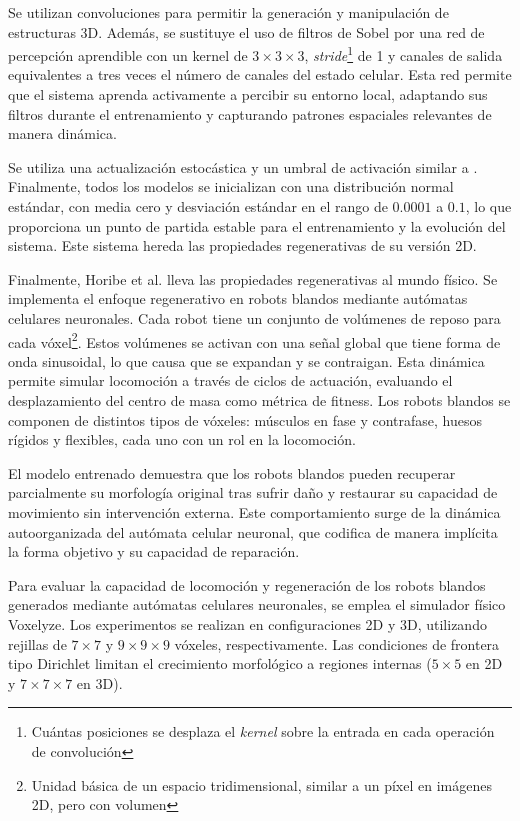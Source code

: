Se utilizan convoluciones para permitir la generación y manipulación de estructuras 3D. Además, se sustituye el uso de filtros de Sobel por una red de percepción aprendible con un kernel de $3 \times 3 \times 3$, \textit{stride}\footnote{Cuántas posiciones se desplaza el \textit{kernel} sobre la entrada en cada operación de convolución} de 1 y canales de salida equivalentes a tres veces el número de canales del estado celular. Esta red permite que el sistema aprenda activamente a percibir su entorno local, adaptando sus filtros durante el entrenamiento y capturando patrones espaciales relevantes de manera dinámica.

Se utiliza una actualización estocástica y un umbral de activación similar a \cite{mordvintsevNCA}. Finalmente, todos los modelos se inicializan con una distribución normal estándar, con media cero y desviación estándar en el rango de $0.0001$ a $0.1$, lo que proporciona un punto de partida estable para el entrenamiento y la evolución del sistema. Este sistema hereda las propiedades regenerativas de su versión 2D.

Finalmente, Horibe et al. \cite{horibe} lleva las propiedades regenerativas al mundo físico. Se implementa el enfoque regenerativo en robots blandos mediante autómatas celulares neuronales. Cada robot tiene un conjunto de volúmenes de reposo para cada vóxel\footnote{Unidad básica de un espacio tridimensional, similar a un píxel en imágenes 2D, pero con volumen}. Estos volúmenes se activan con una señal global que tiene forma de onda sinusoidal, lo que causa que se expandan y se contraigan. Esta dinámica permite simular locomoción a través de ciclos de actuación, evaluando el desplazamiento del centro de masa como métrica de fitness. Los robots blandos se componen de distintos tipos de vóxeles: músculos en fase y contrafase, huesos rígidos y flexibles, cada uno con un rol en la locomoción.

El modelo entrenado demuestra que los robots blandos pueden recuperar parcialmente su morfología original tras sufrir daño y restaurar su capacidad de movimiento sin intervención externa. Este comportamiento surge de la dinámica autoorganizada del autómata celular neuronal, que codifica de manera implícita la forma objetivo y su capacidad de reparación.

Para evaluar la capacidad de locomoción y regeneración de los robots blandos generados mediante autómatas celulares neuronales, se emplea el simulador físico Voxelyze. Los experimentos se realizan en configuraciones 2D y 3D, utilizando rejillas de $7 \times 7$ y $9 \times 9 \times 9$ vóxeles, respectivamente. Las condiciones de frontera tipo Dirichlet limitan el crecimiento morfológico a regiones internas ($5 \times 5$ en 2D y $7 \times 7 \times 7$ en 3D).

